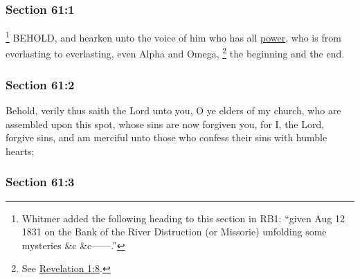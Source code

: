 	\subsubsection{Section 61:1} %
		\label{DC61-1}

			\footnote{%
				Whitmer added the following heading to this section in RB1: ``given Aug 12 1831 on the Bank of the River Distruction (or Missorie) unfolding some mysteries \&c \&c------.''
				}%
		BEHOLD, and hearken unto the voice of him who has all \hyperref[POWER]{power}, who is from everlasting to everlasting, even Alpha and Omega,%
			\footnote{%
				See \hyperref[REVELATIONNT-1-8]{Revelation 1:8}.
				}
		the beginning and the end.


	\subsubsection{Section 61:2} %
		\label{DC61-2}

		Behold, verily thus saith the Lord unto you, O ye elders of my church, who are assembled upon this spot, whose sins are now forgiven you, for I, the Lord, forgive sins, and am merciful unto those who confess their sins with humble hearts;


	\subsubsection{Section 61:3} %
		\label{DC61-3}

